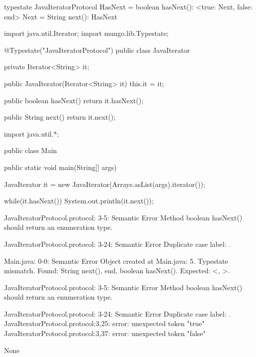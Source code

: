 \begin{code}
typestate JavaIteratorProtocol {
  HasNext = {
    boolean hasNext(): <true: Next, false: end>
  }
  Next = {
    String next(): HasNext
  }
}\end{code}

\begin{code}
import java.util.Iterator;
import mungo.lib.Typestate;

@Typestate("JavaIteratorProtocol")
public class JavaIterator {

  private Iterator<String> it;

  public JavaIterator(Iterator<String> it) {
    this.it = it;
  }

	public boolean hasNext() {
    return it.hasNext();
  }

  public String next() {
    return it.next();
  }

}\end{code}

\begin{code}
import java.util.*;

public class Main {
	public static void main(String[] args) {
		JavaIterator it = new JavaIterator(Arrays.asList(args).iterator());
    
    while(it.hasNext()){
      System.out.println(it.next());
    }
	}
}\end{code}

\lstset{language=,caption=Mungo's output}
\begin{code}

JavaIteratorProtocol.protocol: 3-5: Semantic Error
		Method boolean hasNext() should return an enumeration type.

JavaIteratorProtocol.protocol: 3-24: Semantic Error
		Duplicate case label: .

Main.java: 0-0: Semantic Error
		Object created at Main.java: 5. Typestate mismatch. Found: String next(), end, boolean hasNext(). Expected: <, >.

JavaIteratorProtocol.protocol: 3-5: Semantic Error
		Method boolean hasNext() should return an enumeration type.

JavaIteratorProtocol.protocol: 3-24: Semantic Error
		Duplicate case label: .
JavaIteratorProtocol.protocol:3,25: error: unexpected token "true"
JavaIteratorProtocol.protocol:3,37: error: unexpected token "false"
\end{code}

\lstset{language=,caption=Our tool's output}
\begin{code}
None
\end{code}

